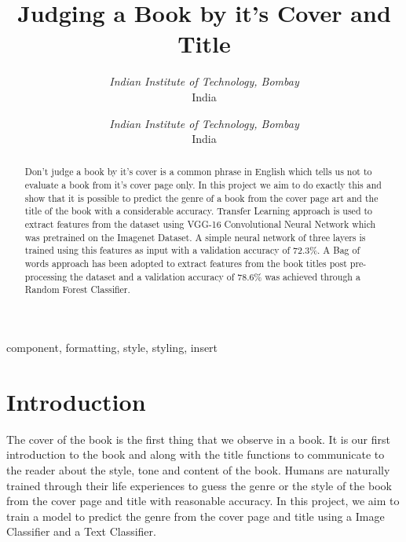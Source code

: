 \documentclass[conference]{IEEEtran}
\begin{document}
\title{Judging a Book by it's Cover and Title\\}

\author{
\textit{Indian Institute of Technology, Bombay}\\
India
\and
{}
\textit{Indian Institute of Technology, Bombay}\\
India
}

\maketitle

\begin{abstract}

Don't judge a book by it's cover is a common phrase in English which tells us not to evaluate a book from it’s cover page only. In this project we aim to do exactly this and show that it is possible to predict the genre of a book from the cover page art and the title of the book with a considerable accuracy.
Transfer Learning approach is used to extract features from the dataset using VGG-16 Convolutional Neural Network which was pretrained on the Imagenet Dataset. A simple neural network of three layers is trained using this features as input with a validation accuracy of 72.3\%. A Bag of words approach has been adopted to extract features from the book titles post pre-processing the dataset and a validation accuracy of 78.6\% was achieved through a Random Forest Classifier. 

\end{abstract}

\begin{IEEEkeywords}
component, formatting, style, styling, insert
\end{IEEEkeywords}

\section{Introduction}

The cover of the book is the first thing that we observe in a book. It is our first introduction to the book and along with the title functions to communicate to the reader about the style, tone and content of the book. Humans are naturally trained through their life experiences to guess the genre or the style of the book from the cover page and title with reasonable accuracy. In this project, we aim to train a model to predict the genre from the cover page and title using a Image Classifier and a Text Classifier. 
\end{document}

